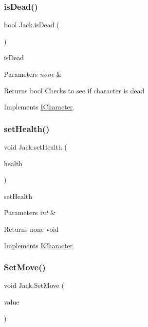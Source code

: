 \subsubsection{\texorpdfstring{is\+Dead()}{isDead()}}
{\footnotesize\ttfamily bool Jack.\+is\+Dead (\begin{DoxyParamCaption}{ }\end{DoxyParamCaption})\hspace{0.3cm}{\ttfamily [inline]}}

is\+Dead 
\begin{DoxyParams}{Parameters}
{\em none} & \\
\hline
\end{DoxyParams}
\begin{DoxyReturn}{Returns}
bool Checks to see if character is dead 
\end{DoxyReturn}


Implements \mbox{\hyperlink{interface_i_character}{I\+Character}}.

\mbox{\label{class_jack_a8d41ae6c0691bcc01910758e106e29cf}} 
\subsubsection{\texorpdfstring{set\+Health()}{setHealth()}}
{\footnotesize\ttfamily void Jack.\+set\+Health (\begin{DoxyParamCaption}\item[{int}]{health }\end{DoxyParamCaption})\hspace{0.3cm}{\ttfamily [inline]}}

set\+Health 
\begin{DoxyParams}{Parameters}
{\em int} & \\
\hline
\end{DoxyParams}
\begin{DoxyReturn}{Returns}
none void 
\end{DoxyReturn}


Implements \mbox{\hyperlink{interface_i_character}{I\+Character}}.

\mbox{\label{class_jack_a5c422cd6a8147746decbfe4b9843f469}} 
\subsubsection{\texorpdfstring{Set\+Move()}{SetMove()}}
{\footnotesize\ttfamily void Jack.\+Set\+Move (\begin{DoxyParamCaption}\item[{bool}]{value }\end{DoxyParamCaption})\hspace{0.3cm}{\ttfamily [inline]}}

